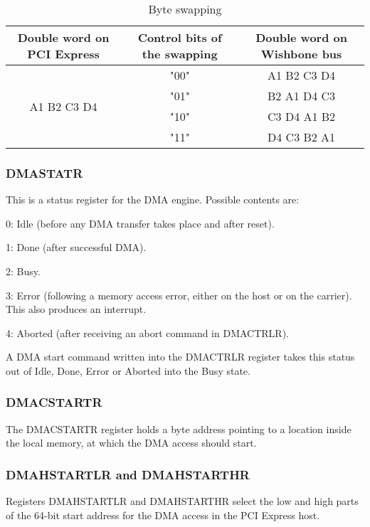 \documentclass[10pt,a4paper]{cerndoc}
\begin{document}
\begin{table}[htbp]
  \centering
  \begin{tabular}{|c|c|c|}                                                      \hline
    Double word on PCI Express & Control bits of the swapping & Double word on Wishbone bus           \\ \hline \hline
     \multirow{4}{*}{A1 B2 C3 D4}
                         &  "00"         &  A1 B2 C3 D4                         \\ \cline{2-3}
                         &  "01"         &  B2 A1 D4 C3                         \\ \cline{2-3}
                         &  "10"         &  C3 D4 A1 B2                         \\ \cline{2-3}
                         &  "11"         &  D4 C3 B2 A1                         \\ \hline

  \end{tabular}
  \caption{Byte swapping}
  \label{tab:byte_swapping}
\end{table}

\subsubsection{DMASTATR}
This is a status register for the DMA engine. Possible contents are:
\begin{packed_item}
\item 0: Idle (before any DMA transfer takes place and after reset).
\item 1: Done (after successful DMA).
\item 2: Busy.
\item 3: Error (following a memory access error, either on the host or on the carrier). This also produces an interrupt.
\item 4: Aborted (after receiving an abort command in DMACTRLR).
\end{packed_item}
A DMA start command written into the DMACTRLR register takes this status out of Idle, Done, Error or Aborted into the Busy state.

\subsubsection{DMACSTARTR}
The DMACSTARTR register holds a byte address pointing to a location inside the local memory, at which the DMA access should start.

\subsubsection{DMAHSTARTLR and DMAHSTARTHR}
Registers DMAHSTARTLR and DMAHSTARTHR select the low and high parts of the 64-bit start address for the DMA access in the PCI Express host. 
\end{document}
